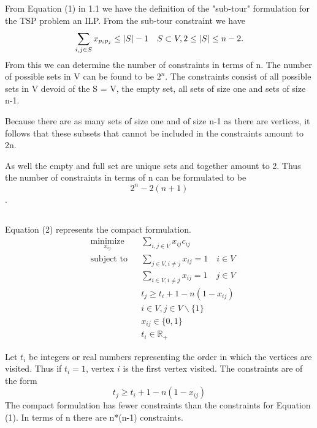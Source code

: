 \documentclass[11pt,a4paper,english]{article}
\begin{document}
\subsection{}
From Equation (1) in 1.1 we have the definition of the "sub-tour" formulation for the TSP problem an ILP. From the sub-tour constraint we have 
$$\sum_{i,j \in S} x_{p_i p_j} \leq |S| - 1 \quad S \subset V, 2 \leq |S| \leq n-2\mathnormal{.}$$
From this we can determine the number of constraints in terms of n.
The number of possible sets in V can be found to be $2^n$. 
The constraints consist of all possible sets in V devoid of the S = V, the empty set, all sets of size one and sets of size n-1. 

Because there are as many sets of size one and of size n-1 as there are vertices, it follows that these subsets that cannot be included in the constraints amount to 2n. 

As well the empty and full set are unique sets and together amount to 2. 
Thus the number of constraints in terms of n can be formulated to be $$2^n - 2(n+1)$$.

\subsection{}
Equation (2) represents the compact formulation.  
 \begin{equation}
   \label{eq:tsp:subtour}
   \begin{aligned}
     & \underset{x_{ij}}{\text{minimize}}
     & & \sum_{i,j \in V} x_{ij}c_{ij} \\
     & \text{subject to}
     & & \sum_{j \in V, i \neq j} x_{ij} = 1 \quad i \in V \\
     & & & \sum_{i \in V, i \neq j} x_{ij} = 1 \quad j \in V \\
     & & & t_{j} \geq t_{i} + 1 - n(1-x_{ij} )\\
     & & & i\in V, j\in V \backslash \{1\} \\
     & & & x_{ij} \in \{0,1\}\\
     & & & t_{i}\in\mathbb{R}_+
   \end{aligned}
 \end{equation}
 
 Let $t_{i}$ be integers or real numbers representing the order in which the vertices are visited. Thus if $t_{i} = 1$, vertex $i$ is the first vertex visited.
The constraints are of the form $$t_{j} \geq t_{i} + 1 - n(1-x_{ij} )$$ The compact formulation has fewer constraints than the constraints for Equation (1).
In terms of n there are n*(n-1) constraints.
\end{document}
